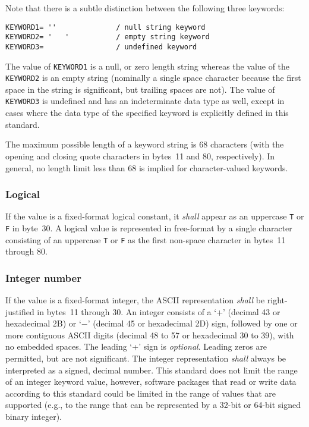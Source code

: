 \documentclass[onecolumn]{aa}
\begin{document}
Note that there is a subtle distinction between the following three keywords:
\begin{verbatim}
KEYWORD1= ''              / null string keyword
KEYWORD2= '   '           / empty string keyword
KEYWORD3=                 / undefined keyword

\end{verbatim}
\noindent
The value of {\tt KEYWORD1} is a null, or zero length string whereas the
value of the {\tt KEYWORD2} is an empty string (nominally a single space
character because the first space in the string is significant, but
trailing spaces are not).  The value of {\tt KEYWORD3} is undefined and has
an indeterminate data type as well, except in cases where the data type
of the specified keyword is explicitly defined in this standard.

The maximum possible length of a keyword string is 68 characters (with
the opening and closing quote characters in bytes~11 and 80,
respectively).  In general, no length limit less than 68 is implied
for character-valued keywords.

   \subsubsection{Logical}
   \label{s:ffl}
   If the value is a fixed-format logical constant, it {\em shall} appear as
   an uppercase {\tt T} or {\tt F} in byte~30.
   A logical value is represented in free-format by a single character 
   consisting of an uppercase {\tt T} or {\tt F} as the first 
   non-space character in bytes~11 through 80.

   \subsubsection{Integer number}
   \label{s:ffi}

   If the value is a fixed-format integer, the ASCII representation {\em shall}
   be right-justified in bytes~11 through 30.  An integer consists of a
   `+' (decimal 43 or hexadecimal 2B) or `$-$' (decimal 45 or hexadecimal 2D) sign, 
   followed by one or more contiguous ASCII digits
   (decimal 48 to 57 or hexadecimal 30 to 39), with no embedded spaces. 
   The leading `+' sign is {\em optional}. 
   Leading zeros are permitted, but are not
   significant.  The integer representation {\em shall} always be interpreted as a signed,
   decimal number.
This standard does not limit the range of 
an integer keyword value, however, software packages that read or write 
data according to this standard could be limited in the range of 
values that are supported (e.g., to the range that 
can be represented by a 32-bit or 64-bit signed binary integer).
\end{document}
